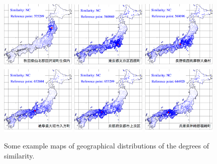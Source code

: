 \documentclass[output=paper]{LSP/langsci}
\begin{document}
\begin{figure}
\includegraphics[width=0.32\textwidth]{illustrations/kuma_fig20-1}
\includegraphics[width=0.32\textwidth]{illustrations/kuma_fig20-2}
\includegraphics[width=0.32\textwidth]{illustrations/kuma_fig20-3}
\\
\includegraphics[width=0.32\textwidth]{illustrations/kuma_fig20-4}
\includegraphics[width=0.32\textwidth]{illustrations/kuma_fig20-5}
\includegraphics[width=0.32\textwidth]{illustrations/kuma_fig20-6}
\caption{Some example maps of geographical distributions of the degrees of similarity.}          
\label{fig:20}
\end{figure}
\end{document}
